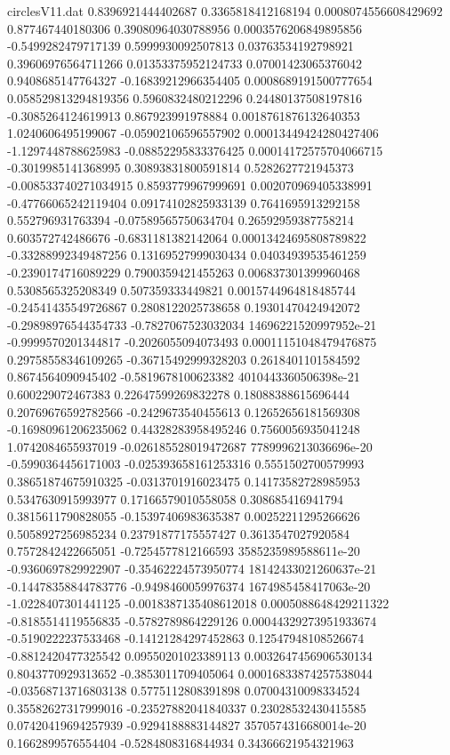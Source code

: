 \begin{filecontents}{circlesV11.dat}
0.8396921444402687	0.3365818412168194	0.0008074556608429692
0.877467440180306	0.39080964030788956	0.0003576206849895856
-0.5499282479717139	0.5999930092507813	0.03763534192798921
0.39606976564711266	0.01353375952124733	0.07001423065376042
0.9408685147764327	-0.16839212966354405	0.0008689191500777654
0.058529813294819356	0.5960832480212296	0.24480137508197816
-0.3085264124619913	0.867923991978884	0.0018761876132640353
1.0240606495199067	-0.05902106596557902	0.00013449424280427406
-1.1297448788625983	-0.08852295833376425	0.00014172575704066715
-0.3019985141368995	0.30893831800591814	0.5282627721945373
-0.008533740271034915	0.8593779967999691	0.002070969405338991
-0.47766065242119404	0.09174102825933139	0.7641695913292158
0.552796931763394	-0.07589565750634704	0.26592959387758214
0.603572742486676	-0.6831181382142064	0.00013424695808789822
-0.33288992349487256	0.13169527999030434	0.04034939535461259
-0.2390174716089229	0.7900359421455263	0.006837301399960468
0.5308565325208349	0.507359333449821	0.0015744964818485744
-0.24541435549726867	0.2808122025738658	0.19301470424942072
-0.29898976544354733	-0.7827067523032034	14696221520997952e-21
-0.9999570201344817	-0.2026055094073493	0.00011151048479476875
0.29758558346109265	-0.36715492999328203	0.2618401101584592
0.8674564090945402	-0.5819678100623382	4010443360506398e-21
0.600229072467383	0.22647599269832278	0.18088388615696444
0.20769676592782566	-0.2429673540455613	0.12652656181569308
-0.16980961206235062	0.44328283958495246	0.7560056935041248
1.0742084655937019	-0.026185528019472687	7789996213036696e-20
-0.5990364456171003	-0.025393658161253316	0.5551502700579993
0.38651874675910325	-0.0313701916023475	0.14173582728985953
0.5347630915993977	0.17166579010558058	0.308685416941794
0.3815611790828055	-0.15397406983635387	0.00252211295266626
0.5058927256985234	0.23791877175557427	0.3613547027920584
0.7572842422665051	-0.7254577812166593	3585235989588611e-20
-0.9360697829922907	-0.35462224573950774	18142433021260637e-21
-0.14478358844783776	-0.9498460059976374	1674985458417063e-20
-1.0228407301441125	-0.0018387135408612018	0.0005088648429211322
-0.8185514119556835	-0.5782789864229126	0.00044329273951933674
-0.5190222237533468	-0.14121284297452863	0.12547948108526674
-0.8812420477325542	0.09550201023389113	0.0032647456906530134
0.8043770929313652	-0.3853011709405064	0.00016833874257538044
-0.03568713716803138	0.5775112808391898	0.07004310098334524
0.35582627317999016	-0.23527882041840337	0.23028532430415585
0.07420419694257939	-0.9294188883144827	3570574316680014e-20
0.1662899576554404	-0.5284808316844934	0.34366621954321963

\end{filecontents}
